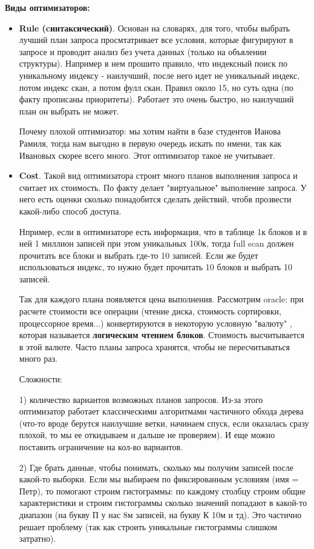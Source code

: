 \textbf{Виды оптимизаторов:} 
\begin{itemize}
    \item \textbf{Rule (cинтаксический)}. Основан на словарях, для того, чтобы выбрать лучший план запроса просмтатривает все условия, которые фигурируют в запросе и проводит анализ без учета данных (только на объялении структуры). Например в нем прошито правило, что индексный поиск по уникальному индексу - наилучший, после него идет не уникальный индекс, потом индекс скан, а потом фулл скан. Правил около 15, но суть одна (по факту прописаны приоритеты). Работает это очень быстро, но наилучший план он выбрать не может.
    
Почему плохой оптимизатор: мы хотим найти в базе студентов Ианова Рамиля, тогда нам выгодно в первую очередь искать по имени, так как Ивановых скорее всего много. Этот оптимизатор такое не учитывает. 

\item \textbf{Cost}. Такой вид оптимизатора строит много планов выполнения запроса и считает их стоимость. По факту делает "виртуальное" выполнение запроса. У него есть оценки сколько понадобится сделать действий, чтобв прозвести какой-либо способ доступа. 
    
Нпример, если в оптимизаторе есть информация, что в таблице 1к блоков и в ней 1 миллион записей при этом уникальных 100к, тогда full scan должен прочитать все блоки и выбрать где-то 10 записей. Если же будет использоваться индекс, то нужно будет прочитать 10 блоков и выбрать 10 записей. 
    
Так для каждого плана появляется цена выполнения. Рассмотрим oracle: при расчете стоимости все операции (чтение диска, стоимость сортировки, процессорное время...) конвертируются в некоторую условную "валюту" , которая называется \textbf{логическим чтением блоков}. Стоимость высчитывается в этой валюте. Часто планы запроса хранятся, чтобы не пересчитываться много раз. 
    
Сложности: 
    
1) количество вариантов возможных планов запросов. Из-за этого оптимизатор работает классическими алгоритмами частичного обхода дерева (что-то вроде берутся наилучшие ветки, начинаем спуск, если оказалась сразу плохой, то мы ее откидываем и дальше не проверяем). И еще можно поставить ограничение на кол-во вариантов. 
    
2) Где брать данные, чтобы понимать, сколько мы получим записей после какой-то выборки. Если мы выбираем по фиксированным условиям (имя = Петр), то помогают строим гистограммы: по каждому столбцу строим общие характеристики и строим гистограммы сколько значений попадают в какой-то диапазон (на букву П у нас 8м записей, на букву К 10м и тд). Это частично решает проблему (так как строить уникальные гистограммы слишком затратно). 
    

\end{itemize}
